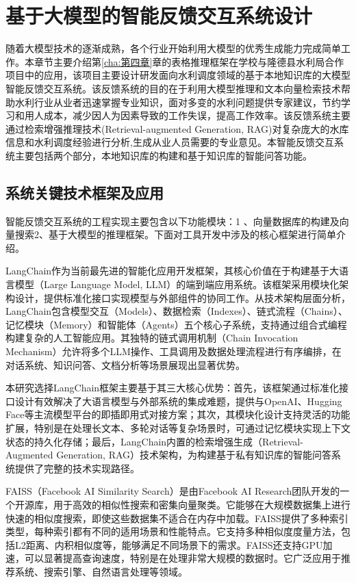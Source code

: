 \chapter{基于大模型的智能反馈交互系统设计}
\label{cha:第五章}

随着大模型技术的逐渐成熟，各个行业开始利用大模型的优秀生成能力完成简单工作。本章节主要介绍第\ref{cha:第四章}章的表格推理框架在学校与隆德县水利局合作项目中的应用，该项目主要设计研发面向水利调度领域的基于本地知识库的大模型智能反馈交互系统。该反馈系统的目的在于利用大模型推理和文本向量检索技术帮助水利行业从业者迅速掌握专业知识，面对多变的水利问题提供专家建议，节约学习和用人成本，减少因人为因素导致的工作失误，提高工作效率。该反馈系统主要通过检索增强推理技术(Retrieval-augmented Generation, RAG)对复杂庞大的水库信息和水利调度经验进行分析,生成从业人员需要的专业意见。本智能反馈交互系统主要包括两个部分，本地知识库的构建和基于知识库的智能问答功能。
\section{系统关键技术框架及应用}

智能反馈交互系统的工程实现主要包含以下功能模块：1 、向量数据库的构建及向量搜索2、基于大模型的推理框架。下面对工具开发中涉及的核心框架进行简单介绍。

LangChain作为当前最先进的智能化应用开发框架，其核心价值在于构建基于大语言模型（Large Language Model, LLM）的端到端应用系统。该框架采用模块化架构设计，提供标准化接口实现模型与外部组件的协同工作。从技术架构层面分析，LangChain包含模型交互（Models）、数据检索（Indexes）、链式流程（Chains）、记忆模块（Memory）和智能体（Agents）五个核心子系统，支持通过组合式编程构建复杂的人工智能应用。其独特的链式调用机制（Chain Invocation Mechanism）允许将多个LLM操作、工具调用及数据处理流程进行有序编排，在对话系统、知识问答、文档分析等场景展现出显著优势。

本研究选择LangChain框架主要基于其三大核心优势：首先，该框架通过标准化接口设计有效解决了大语言模型与外部系统的集成难题，提供与OpenAI、Hugging Face等主流模型平台的即插即用式对接方案；其次，其模块化设计支持灵活的功能扩展，特别是在处理长文本、多轮对话等复杂场景时，可通过记忆模块实现上下文状态的持久化存储；最后，LangChain内置的检索增强生成（Retrieval-Augmented Generation, RAG）技术架构，为构建基于私有知识库的智能问答系统提供了完整的技术实现路径。

FAISS\cite{johnsonBillionscaleSimilaritySearch2019}（Facebook AI Similarity Search）是由Facebook AI Research团队开发的一个开源库，用于高效的相似性搜索和密集向量聚类。它能够在大规模数据集上进行快速的相似度搜索，即使这些数据集不适合在内存中加载。FAISS提供了多种索引类型，每种索引都有不同的适用场景和性能特点。它支持多种相似度度量方法，包括L2距离、内积相似度等，能够满足不同场景下的需求。FAISS还支持GPU加速，可以显著提高查询速度，特别是在处理非常大规模的数据时。它广泛应用于推荐系统、搜索引擎、自然语言处理等领域。

